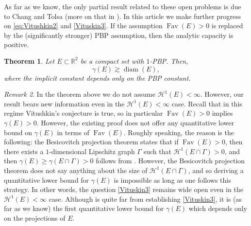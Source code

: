 \documentclass[11pt,reqno]{amsart}
\DeclareMathOperator{\diam}{diam}
\newtheorem{theorem}{Theorem}[section]
\theoremstyle{definition}
\theoremstyle{remark}
\newtheorem{remark}[theorem]{Remark}
\numberwithin{equation}{section}
\newcommand{\R}{\mathbb{R}}
\newcommand{\dH}{\mathcal{H}}
\DeclareMathOperator{\Fav}{Fav}
\theoremstyle{theorem}
\theoremstyle{definition}
\theoremstyle{remark}
\numberwithin{equation}{section}
\begin{document}
	As far as we know, the only partial result related to these open problems is due to Chang and Tolsa \cite{chang2017analytic} (more on that in ). In this article we make further progress on \eqref{eq:Vitushkin2} and \eqref{Vituskin3}. If the assumption $\Fav(E)>0$ is replaced by the (significantly stronger) PBP assumption, then the analytic capacity is positive.
	\begin{theorem}\label{thm:main analytic cap}
		Let $E\subset\R^2$ be a compact set with $1$-PBP. Then,
		\begin{equation}\label{eq:thm analytic cap}
		\gamma(E)\gtrsim \diam(E),
		\end{equation}
		where the implicit constant depends only on the PBP constant.
	\end{theorem}
	\begin{remark}
		In the theorem above we do not assume $\dH^1(E)<\infty$. However, our result bears new information even in the $\dH^1(E)<\infty$ case. Recall that in this regime Vitushkin's conjecture is true, so in particular $\Fav(E)>0$ implies $\gamma(E)>0$. However, the existing proof does not offer any quantitative lower bound on $\gamma(E)$ in terms of $\Fav(E)$. Roughly speaking, the reason is the following: the Besicovitch projection theorem states that if $\Fav(E)>0$, then there exists a $1$-dimensional Lipschitz graph $\Gamma$ such that $\dH^1(E\cap\Gamma)>0$, and then $\gamma(E)\ge \gamma(E\cap\Gamma)>0$ follows from \cite{calderon1977cauchy}. However, the Besicovitch projection theorem does not say anything about the size of $\dH^1(E\cap\Gamma)$, and so deriving a quantitative lower bound for $\gamma(E)$ is impossible as long as one follows this strategy. In other words, the question \eqref{Vituskin3} remains wide open even in the $\dH^1(E)<\infty$ case. Although  is quite far from establishing \eqref{Vituskin3}, it is (as far as we know) the first quantitative lower bound for $\gamma(E)$ which depends only on the projections of $E$. 
	\end{remark}
		
\end{document}
